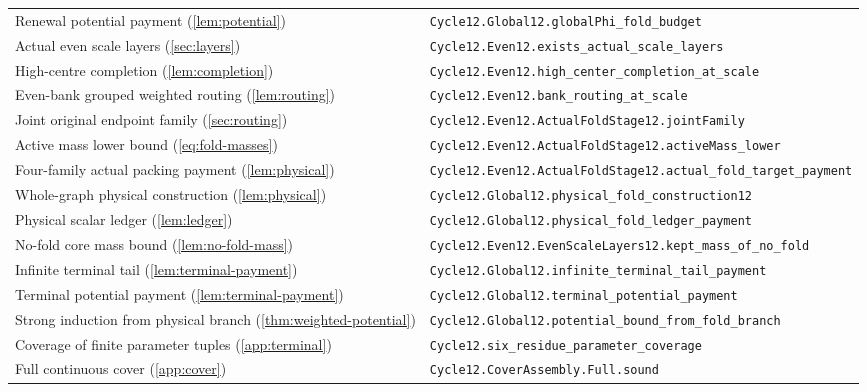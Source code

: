 \begin{longtable}{@{}p{}p{}@{}}
Renewal potential payment (\ref{lem:potential}) & {\small\nolinkurl{Cycle12.Global12.globalPhi_fold_budget}}\\[7pt]
Actual even scale layers (\ref{sec:layers}) & {\small\nolinkurl{Cycle12.Even12.exists_actual_scale_layers}}\\[7pt]
High-centre completion (\ref{lem:completion}) & {\small\nolinkurl{Cycle12.Even12.high_center_completion_at_scale}}\\[7pt]
Even-bank grouped weighted routing (\ref{lem:routing}) & {\small\nolinkurl{Cycle12.Even12.bank_routing_at_scale}}\\[7pt]
Joint original endpoint family (\ref{sec:routing}) & {\small\nolinkurl{Cycle12.Even12.ActualFoldStage12.jointFamily}}\\[7pt]
Active mass lower bound (\ref{eq:fold-masses}) & {\small\nolinkurl{Cycle12.Even12.ActualFoldStage12.activeMass_lower}}\\[7pt]
Four-family actual packing payment (\ref{lem:physical}) & {\small\nolinkurl{Cycle12.Even12.ActualFoldStage12.actual_fold_target_payment}}\\[7pt]
Whole-graph physical construction (\ref{lem:physical}) & {\small\nolinkurl{Cycle12.Global12.physical_fold_construction12}}\\[7pt]
Physical scalar ledger (\ref{lem:ledger}) & {\small\nolinkurl{Cycle12.Global12.physical_fold_ledger_payment}}\\[7pt]
No-fold core mass bound (\ref{lem:no-fold-mass}) & {\small\nolinkurl{Cycle12.Even12.EvenScaleLayers12.kept_mass_of_no_fold}}\\[7pt]
Infinite terminal tail (\ref{lem:terminal-payment}) & {\small\nolinkurl{Cycle12.Global12.infinite_terminal_tail_payment}}\\[7pt]
Terminal potential payment (\ref{lem:terminal-payment}) & {\small\nolinkurl{Cycle12.Global12.terminal_potential_payment}}\\[7pt]
Strong induction from physical branch (\ref{thm:weighted-potential}) & {\small\nolinkurl{Cycle12.Global12.potential_bound_from_fold_branch}}\\[7pt]
Coverage of finite parameter tuples (\ref{app:terminal}) & {\small\nolinkurl{Cycle12.six_residue_parameter_coverage}}\\[7pt]
Full continuous cover (\ref{app:cover}) & {\small\nolinkurl{Cycle12.CoverAssembly.Full.sound}}\\[7pt]
\bottomrule\end{longtable}
